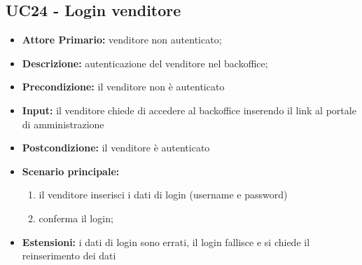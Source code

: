 \subsection{UC24 - Login venditore}
\label{UC24}
\begin{itemize}
    \item \textbf{Attore Primario:} venditore non autenticato;
    \item \textbf{Descrizione:} autenticazione del venditore nel backoffice;
    \item \textbf{Precondizione:} il venditore non è autenticato
    \item \textbf{Input:} il venditore chiede di accedere al backoffice inserendo il link al portale di amministrazione
    \item \textbf{Postcondizione:} il venditore è autenticato
    \item \textbf{Scenario principale:}
    \begin{enumerate}
        \item il venditore inserisci i dati di login (username e password)
        \item conferma il login;
    \end{enumerate}
    \item \textbf{Estensioni:} i dati di login sono errati, il login fallisce e si chiede il reinserimento dei dati
\end{itemize}